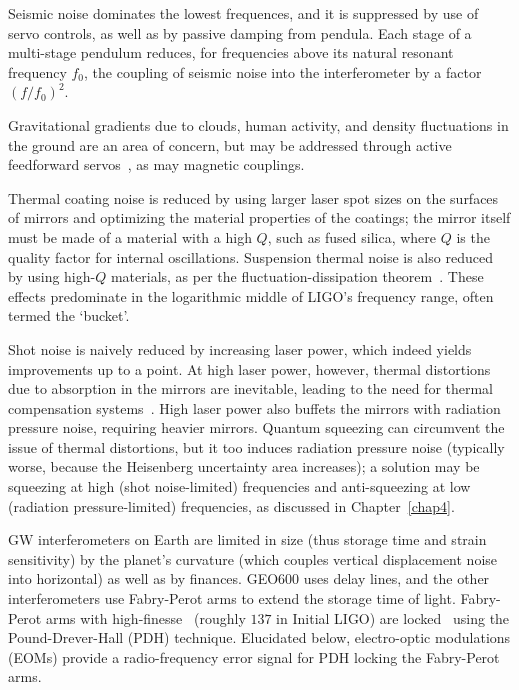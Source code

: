 Seismic noise dominates the lowest frequences, and it is suppressed by use of servo controls, as well as by passive damping from pendula.
Each stage of a multi-stage pendulum reduces, for frequencies above its natural resonant frequency $f_0$, the coupling of seismic noise into the interferometer by a factor $(f/f_0)^2$.

Gravitational gradients due to clouds, human activity, and density fluctuations in the ground are an area of concern, but may be addressed through active feedforward servos~\cite{Driggers2012ActiveNoise}, as may magnetic couplings.

Thermal coating noise is reduced by using larger laser spot sizes on the surfaces of mirrors and optimizing the material properties of the coatings; the mirror itself must be made of a material with a high $Q$, such as fused silica, where $Q$ is the quality factor for internal oscillations.
Suspension thermal noise is also reduced by using high-$Q$ materials, as per the fluctuation-dissipation theorem~\cite{Saulson}.
These effects predominate in the logarithmic middle of LIGO's frequency range, often termed the `bucket'.

Shot noise is naively reduced by increasing laser power, which indeed yields improvements up to a point.
At high laser power, however, thermal distortions due to absorption in the mirrors are inevitable, leading to the need for thermal compensation systems~\cite{BallmerThesis}.
High laser power also buffets the mirrors with radiation pressure noise, requiring heavier mirrors.
Quantum squeezing can circumvent the issue of thermal distortions, but it too induces radiation pressure noise (typically worse, because the Heisenberg uncertainty area increases); a solution may be squeezing at high (shot noise-limited) frequencies and anti-squeezing at low (radiation pressure-limited) frequencies, as discussed in Chapter~\ref{chap4}.


GW interferometers on Earth are limited in size (thus storage time and strain sensitivity) by the planet's curvature (which couples vertical displacement noise into horizontal) as well as by finances. 
GEO600 uses delay lines, and the other interferometers use Fabry-Perot arms to extend the storage time of light.
Fabry-Perot arms with high-finesse~\cite{ResonanceFP,ResponsesFP} (roughly $137$ in Initial LIGO) are locked~\cite{PDHNotes} using the Pound-Drever-Hall (PDH) technique.
Elucidated below, electro-optic modulations (EOMs) provide a radio-frequency error signal for PDH locking the Fabry-Perot arms.


